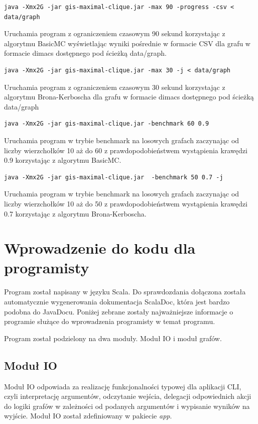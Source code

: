 \documentclass[12pt, a4paper]{article}
\begin{document}
\begin{verbatim}
java -Xmx2G -jar gis-maximal-clique.jar -max 90 -progress -csv < data/graph
\end{verbatim}
Uruchamia program z ograniczeniem czasowym 90 sekund korzystając z algorytmu BasicMC wyświetlając wyniki pośrednie w formacie CSV dla grafu w formacie dimacs dostępnego pod ścieżką data/graph.

\begin{verbatim}
java -Xmx2G -jar gis-maximal-clique.jar -max 30 -j < data/graph 
\end{verbatim}
Uruchamia program z ograniczeniem czasowym 30 sekund korzystając z algorytmu Brona-Kerboscha dla grafu w formacie dimacs dostępnego pod ścieżką data/graph

\begin{verbatim}
java -Xmx2G -jar gis-maximal-clique.jar -benchmark 60 0.9
\end{verbatim}
Uruchamia program w trybie benchmark na losowych grafach zaczynając od liczby wierzchołków 10 aż do 60 z prawdopodobieństwem wystąpienia krawędzi 0.9 korzystając z algorytmu BasicMC.

\begin{verbatim}
java -Xmx2G -jar gis-maximal-clique.jar  -benchmark 50 0.7 -j
\end{verbatim}
Uruchamia program w trybie benchmark na losowych grafach zaczynając od liczby wierzchołków 10 aż do 50 z prawdopodobieństwem wystąpienia krawędzi 0.7 korzystając z algorytmu Brona-Kerboscha.

\section{Wprowadzenie do kodu dla programisty}
Program został napisany w języku Scala. Do sprawdozdania dołączona została automatycznie wygenerowania dokumentacja ScalaDoc, która jest bardzo podobna do JavaDocu. Poniżej zebrane zostały najważniejsze informacje o programie służące do wprowadzenia programisty w temat programu.

Program został podzielony na dwa moduły. Moduł IO i moduł grafów. 

\subsection{Moduł IO}
Moduł IO odpowiada za realizację funkcjonalności typowej dla aplikacji CLI, czyli interpretację argumentów, odczytanie wejścia, delegacji odpowiednich akcji do logiki grafów w zależności od podanych argumentów i wypisanie wyników na wyjście. Moduł IO został zdefiniowany w pakiecie \emph{app}.
\end{document}
